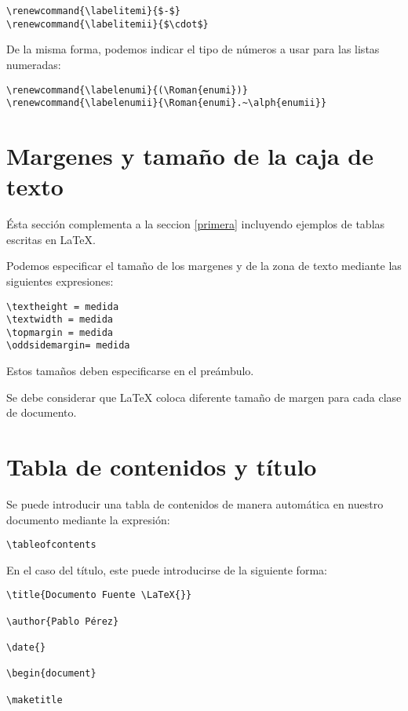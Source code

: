 \documentclass[letterpaper,11pt]{article}
\begin{document}
\begin{verbatim}
\renewcommand{\labelitemi}{$-$}
\renewcommand{\labelitemii}{$\cdot$}
\end{verbatim}

De la misma forma, podemos indicar el tipo de números a usar para las listas numeradas:

\begin{verbatim}
\renewcommand{\labelenumi}{(\Roman{enumi})}
\renewcommand{\labelenumii}{\Roman{enumi}.~\alph{enumii}}
\end{verbatim}

\section{Margenes y tamaño de la caja de texto}

Ésta sección complementa a la seccion \ref{primera} incluyendo ejemplos de tablas escritas en \LaTeX.

Podemos especificar el tamaño de los margenes y de la zona de texto mediante las siguientes expresiones:

\begin{verbatim}
\textheight = medida
\textwidth = medida
\topmargin = medida
\oddsidemargin= medida
\end{verbatim}

Estos tamaños deben especificarse en el preámbulo.

Se debe considerar que \LaTeX{} coloca diferente tamaño de margen para cada clase de documento.

\section{Tabla de contenidos y título}

Se puede introducir una tabla de contenidos de manera automática en nuestro documento mediante la expresión:

\begin{verbatim}
\tableofcontents
\end{verbatim}

En el caso del título, este puede introducirse de la siguiente forma:

\begin{verbatim}
\title{Documento Fuente \LaTeX{}}

\author{Pablo Pérez}

\date{}

\begin{document}

\maketitle
\end{verbatim}
\end{document}
